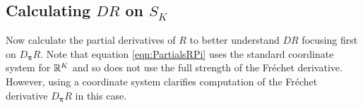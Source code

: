 \subsection{Calculating \( DR \) on \( S_K \) }

%
%



Now calculate the partial derivatives of $R$ to better understand $DR$ focusing first on \( D_{\bm\pi}R \).  Note that equation \eqref{eqn:PartialsRPi} uses the standard coordinate system for \( \mathbb R^{K} \) and so does not use the full strength of the Fr\'{e}chet derivative.  However, using a coordinate system clarifies computation of the Fr\'{e}chet derivative \( D_{\bm\pi}R \) in this case.

